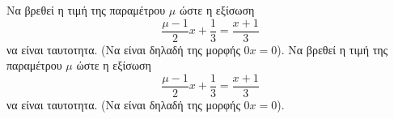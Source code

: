 Να βρεθεί η τιμή της παραμέτρου $ \mu $ ώστε η εξίσωση \[ \dfrac{\mu-1}{2}x+\dfrac{1}{3}=\dfrac{x+1}{3} \] να είναι ταυτοτητα. (Να είναι δηλαδή της μορφής $ 0x=0 $).
Να βρεθεί η τιμή της παραμέτρου $ \mu $ ώστε η εξίσωση \[ \dfrac{\mu-1}{2}x+\dfrac{1}{3}=\dfrac{x+1}{3} \] να είναι ταυτοτητα. (Να είναι δηλαδή της μορφής $ 0x=0 $).
